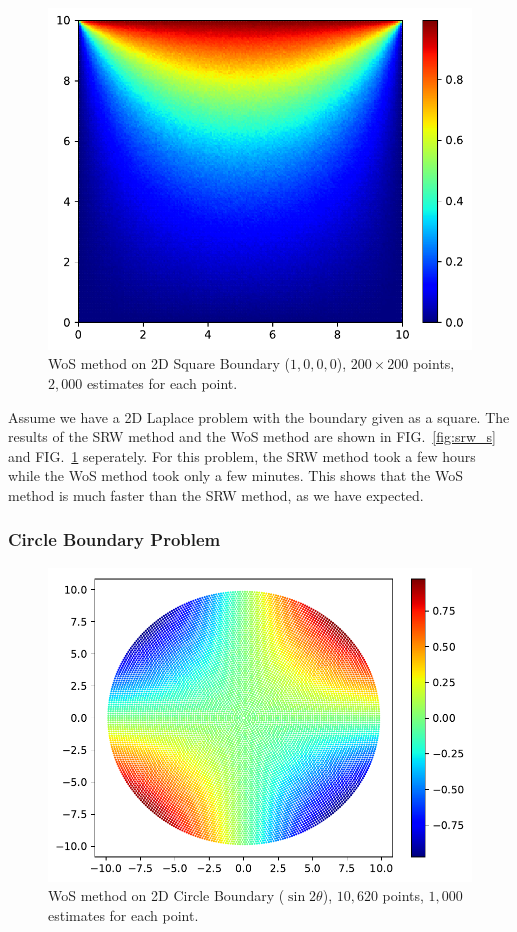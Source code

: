 \documentclass[aps, prl, preprint, groupedaddress]{revtex4-1}
\begin{document}
\begin{figure}[htbp]
    \centering
    \includegraphics[width=.8\textwidth]{./figs/wos_s}
    \caption{\label{fig:wos_s} WoS method on 2D Square Boundary ($1,0,0,0$), $200\times 200$ points, $2,000$ estimates for each point.}
\end{figure}

Assume we have a 2D Laplace problem with the boundary given as a square. The results of the SRW method and the WoS method are shown in FIG.~\ref{fig:srw_s} and FIG.~\ref{fig:wos_s} seperately. For this problem, the SRW method took a few hours while the WoS method took only a few minutes. This shows that the WoS method is much faster than the SRW method, as we have expected.

\subsubsection{Circle Boundary Problem}

\begin{figure}[htbp]
    \centering
    \includegraphics[width=.8\textwidth]{./figs/wos_c}
    \caption{\label{fig:wos_c} WoS method on 2D Circle Boundary ($\sin2\theta$), $10,620$ points, $1,000$ estimates for each point.}
\end{figure}
\end{document}
